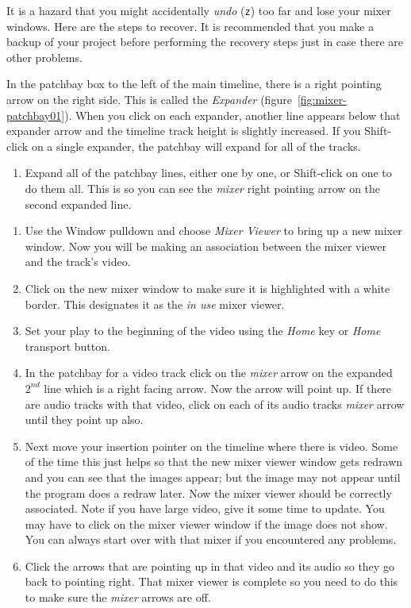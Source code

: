 It is a hazard that you might accidentally \textit{undo} (\texttt{z}) too far and lose your mixer windows.  Here are the steps to recover.  It is recommended that you make a backup of your project before performing the recovery steps just in case there are other problems.

In the patchbay box to the left of the main timeline, there is a right pointing arrow on the right side.  This is called the \textit{Expander} (figure~\ref{fig:mixer-patchbay01}).  When you click on each expander, another line appears below that expander arrow and the timeline track height is slightly increased.  If you Shift-click on a single expander, the patchbay will expand for all of the tracks.

\begin{enumerate}
    \item Expand all of the patchbay lines, either one by one, or Shift-click on one to do them all. This is so you can see the \textit{mixer} right pointing arrow on the second expanded line.    
\end{enumerate}

\begin{enumerate}[resume]
	\item Use the Window pulldown and choose \textit{Mixer Viewer} to bring up a new mixer window.  Now you will be making an association between the mixer viewer and the track’s video.
    \item Click on the new mixer window to make sure it is highlighted with a white border. This designates it as the \textit{in use} mixer viewer.
    \item Set your play to the beginning of the video using the \textit{Home} key or \textit{Home} transport button.
    \item In the patchbay for a video track click on the \textit{mixer} arrow on the expanded $2^{nd}$ line which is a right facing arrow.  Now the arrow will point up.  If there are audio tracks with that video, click on each of its audio tracks \textit{mixer} arrow until they point up also.
    \item Next move your insertion pointer on the timeline where there is video.  Some of the time this just helps so that the new mixer viewer window gets redrawn and you can see that the images appear; but the image may not appear until the program does a redraw later.  Now the mixer viewer should be
    correctly associated.  Note if you have large video, give it some time to update.  You may have to click on the mixer viewer window if the image does not show.  You can always start over with that mixer if you encountered any problems.
    \item Click the arrows that are pointing up in that video and its audio so they go back to pointing right. That mixer viewer is complete so you need to do this to make sure the \textit{mixer} arrows are off.
\end{enumerate}

